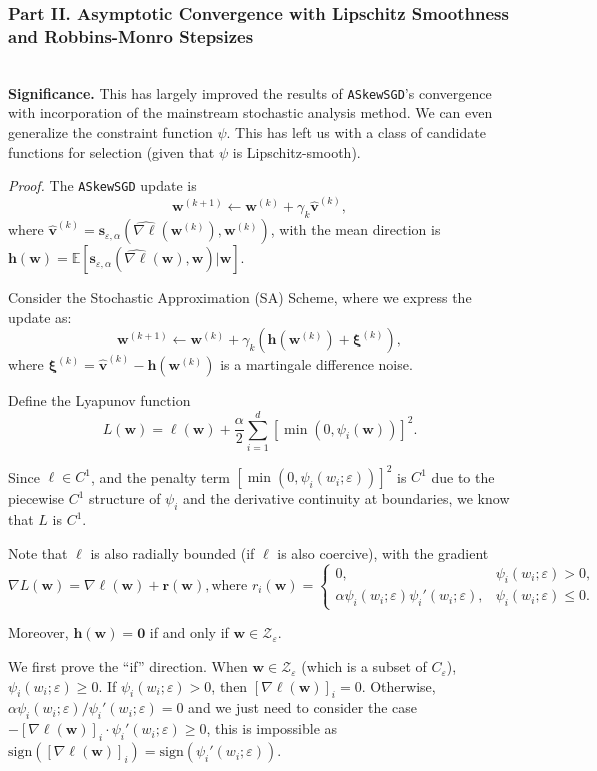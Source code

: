 \documentclass[10pt,a4paper]{article}
\begin{document}
\newpage
\subsubsection{Part II. Asymptotic Convergence with Lipschitz Smoothness and Robbins-Monro Stepsizes}\hfill\\

\textbf{Significance.} This has largely improved the results of \texttt{ASkewSGD}'s convergence with incorporation of the mainstream stochastic analysis method. We can even generalize the constraint function $\psi$. This has left us with a class of candidate functions for selection (given that $\psi$ is Lipschitz-smooth).

\textit{Proof.} The \texttt{ASkewSGD} update is \[\mathbf{w}^{(k+1)}\gets\mathbf{w}^{(k)}+\gamma_k\hat{\mathbf{v}}^{(k)},\]
where $\hat{\mathbf{v}}^{(k)}=\mathbf{s}_{\varepsilon, \alpha}(\widehat{\nabla\ell}(\mathbf{w}^{(k)}),\mathbf{w}^{(k)})$, with the mean direction is $\mathbf{h}(\mathbf{w})=\mathbb{E}[\mathbf{s}_{\varepsilon, \alpha}(\widehat{\nabla\ell}(\mathbf{w}),\mathbf{w})|\mathbf{w}]$.

Consider the Stochastic Approximation (SA) Scheme, where we express the update as:
\[\mathbf{w}^{(k+1)}\gets\mathbf{w}^{(k)}+\gamma_k(\mathbf{h}(\mathbf{w}^{(k)})+\bm{\xi}^{(k)}),\]
where $\bm{\xi}^{(k)}=\hat{\mathbf{v}}^{(k)}-\mathbf{h}(\mathbf{w}^{(k)})$ is a martingale difference noise.

Define the Lyapunov function \[L(\mathbf{w})=\ell(\mathbf{w})+\frac{\alpha}{2}\sum_{i=1}^d [\min(0,\psi_i(\mathbf{w}))]^2.\]

Since $\ell\in C^1$, and the penalty term $[\min(0, \psi_i(w_i;\varepsilon))]^2$ is $C^1$ due to the piecewise $C^1$ structure of $\psi_i$ and the derivative continuity at boundaries, we know that $L$ is $C^1$.

Note that $\ell$ is also radially bounded (if $\ell$ is also coercive), with the gradient \[\nabla L(\mathbf{w})=\nabla \ell(\mathbf{w})+\mathbf{r}(\mathbf{w}), \text{where }r_i(\mathbf{w})=\begin{cases}0, &\psi_i(w_i;\varepsilon)> 0, \\
\alpha\psi_i(w_i;\varepsilon)\psi_i'(w_i;\varepsilon), &\psi_i(w_i;\varepsilon)\leq 0.
\end{cases}\] 

Moreover, $\mathbf{h}(\mathbf{w})=\mathbf{0}$ if and only if $\mathbf{w}\in\mathcal{Z}_\varepsilon$. 

We first prove the ``if'' direction. When $\mathbf{w}\in \mathcal{Z}_\varepsilon$ (which is a subset of $C_\varepsilon$), $\psi_i(w_i;\varepsilon)\geq 0$. If $\psi_i(w_i;\varepsilon)>0$, then $[\nabla\ell(\mathbf{w})]_i=0$. Otherwise, $\alpha\psi_i(w_i;\varepsilon)/\psi_i'(w_i;\varepsilon)=0$ and we just need to consider the case $-[\nabla\ell(\mathbf{w})]_i\cdot \psi_i'(w_i;\varepsilon)\geq  0$, this is impossible as $\text{sign}([\nabla\ell(\mathbf{w})]_i)=\text{sign}(\psi_i'(w_i;\varepsilon))$.
\end{document}
